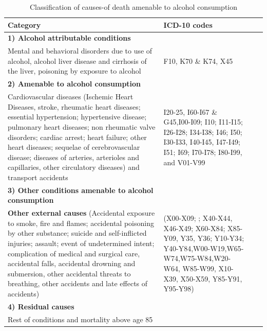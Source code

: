 \documentclass{article}
\begin{document}
\begin{table}[h!]
\caption{Classification of causes-of death amenable to alcohol consumption}
\label{T1}
\begin{center}
 \begin{tabular}{p{10cm}p{6cm}cc}
\hline 
\textbf{Category} & \textbf{ICD-10 codes} \\ 
\hline 
\textbf{1) Alcohol attributable conditions} & \\
Mental and behavioral disorders due to use of alcohol, alcohol liver disease and cirrhosis of the liver, poisoning by exposure to alcohol&F10, K70 \& K74, X45\\
\hline 
\textbf{2) Amenable to alcohol consumption} & \\
Cardiovascular diseases (Ischemic Heart Diseases, stroke, rheumatic heart diseases; essential hypertension; hypertensive disease; pulmonary heart diseases; non rheumatic valve disorders; cardiac arrest; heart failure; other heart diseases; sequelae of cerebrovascular disease; diseases of arteries, arterioles and capillaries, other circulatory diseases) and transport accidents & I20-25, I60-I67 \& G45,I00-I09; I10; I11-I15; I26-I28; I34-I38; I46; I50; I30-I33, I40-I45, I47-I49; I51; I69; I70-I78; I80-I99, and V01-V99\\
\hline 
\textbf{3) Other conditions amenable to alcohol consumption} & \\
\textbf{Other external causes} (Accidental exposure to smoke, fire and flames; accidental poisoning by other substance; suicide and self-inflicted injuries; assault; event of undetermined intent; complication of medical and surgical care, accidental falls, accidental drowning and submersion, other accidental threats to breathing, other accidents and late effects of accidents) &  (X00-X09; ; X40-X44, X46-X49; X60-X84; X85-Y09, Y35, Y36; Y10-Y34; Y40-Y84,W00-W19,W65-W74,W75-W84,W20-W64, W85-W99, X10-X39, X50-X59, Y85-Y91, Y95-Y98)\\
\hline 
\textbf{4) Residual causes} & \\
Rest of conditions and mortality above age 85  &\\
\hline 
\end{tabular} 
\end{center}
\end{table}
\end{document}
